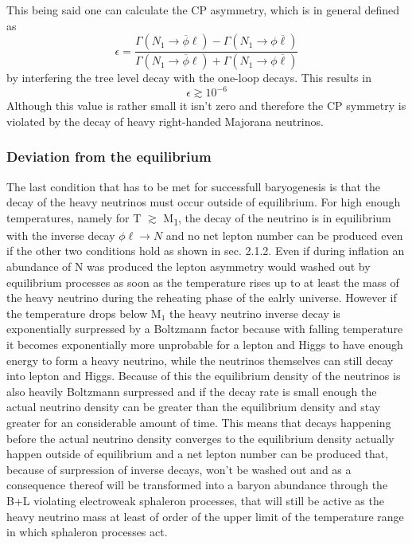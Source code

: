 This being said one can calculate the CP asymmetry\cite[pp. 24ff.]{Davidson:2008bu}, which is in general defined as
\begin{equation}
	\epsilon=\frac{\Gamma(N_1\rightarrow\overline{\phi}\ell)-\Gamma(N_1\rightarrow\phi\overline{\ell})}{\Gamma(N_1\rightarrow\overline{\phi}\ell)+\Gamma(N_1\rightarrow\phi\overline{\ell})}
	\label{eq:CP_violation}
\end{equation}
by interfering the tree level decay with the one-loop decays. This results in \cite[p. 26]{Davidson:2008bu}
\begin{equation}
	\epsilon\gtrsim10^{-6}
	\label{eq:CP_value}
\end{equation}
Although this value is rather small it isn't zero and therefore the CP symmetry is violated by the decay of heavy right-handed Majorana neutrinos. 
\subsubsection{Deviation from the equilibrium}
The last condition that has to be met for successfull baryogenesis is that the decay of the heavy neutrinos must occur outside of equilibrium. For high enough temperatures, namely for T $\gtrsim$ M\textsubscript{1}, the decay of the neutrino is in equilibrium with the inverse decay $\phi\ell\rightarrow N$ and no net lepton number can be produced even if the other two conditions hold as shown in sec. 2.1.2. Even if during inflation an abundance of N was produced the lepton asymmetry would washed out by equilibrium processes as soon as the temperature rises up to at least the mass of the heavy neutrino during the reheating phase of the ealrly universe. \newline
However if the temperature drops below M$_1$ the heavy neutrino inverse decay is exponentially surpressed by a Boltzmann factor because with falling temperature it becomes exponentially more unprobable for a lepton and Higgs to have enough energy to form a heavy neutrino, while the neutrinos themselves can still decay into lepton and Higgs. Because of this the equilibrium density of the neutrinos is also heavily Boltzmann surpressed and if the decay rate is small enough the actual neutrino density can be greater than the equilibrium density and stay greater for an considerable amount of time. This means that decays happening before the actual neutrino density converges to the equilibrium density actually happen outside of equilibrium and a net lepton number can be produced that, because of surpression of inverse decays, won't be washed out and as a consequence thereof will be transformed into a baryon abundance through the B+L violating electroweak sphaleron processes, that will still be active as the heavy neutrino mass at least of order of the upper limit of the temperature range in which sphaleron processes act. \newline
